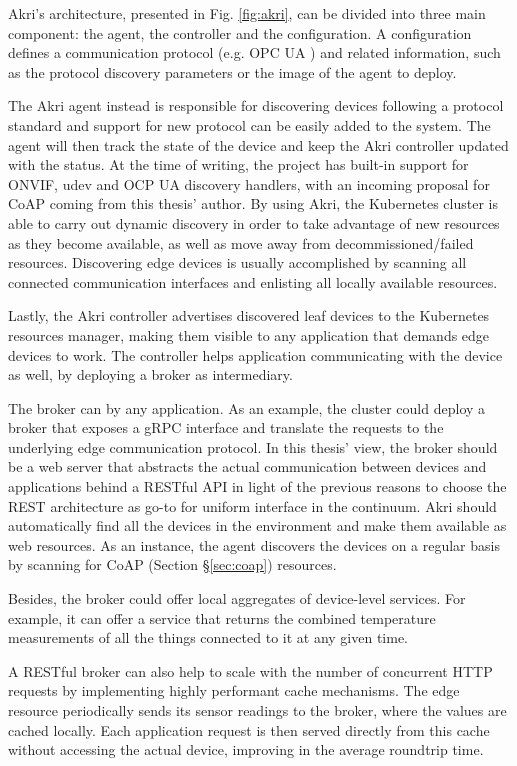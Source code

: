 Akri's architecture, presented in Fig. \ref{fig:akri}, can be divided into three main component: the agent, the controller and the configuration. A configuration defines a communication protocol (e.g. OPC UA \cite{rest-opc}) and related information, such as the protocol discovery parameters or the image of the agent to deploy.

The Akri agent instead is responsible for discovering devices following a protocol standard and support for new protocol can be easily added to the system. The agent will then track the state of the device and keep the Akri controller updated with the status. At the time of writing, the project has built-in support for ONVIF, udev and OCP UA \cite{rest-opc} discovery handlers, with an incoming proposal for CoAP \cite{coap} coming from this thesis' author. By using Akri, the Kubernetes cluster is able to carry out dynamic discovery in order to take advantage of new resources as they become available, as well as move away from decommissioned/failed resources. Discovering edge devices is usually accomplished by scanning all connected communication interfaces and enlisting all locally available resources.

Lastly, the Akri controller advertises discovered leaf devices to the Kubernetes resources manager, making them visible to any application that demands edge devices to work. The controller helps application communicating with the device as well, by deploying a broker as intermediary. 

The broker can by any application. As an example, the cluster could deploy a broker that exposes a gRPC \cite{gRPC} interface and translate the requests to the underlying edge communication protocol. In this thesis' view, the broker should be a web server that abstracts the actual communication between devices and applications behind a RESTful API in light of the previous reasons to choose the REST architecture as go-to for uniform interface in the continuum. Akri should automatically find all the devices in the environment and make them available as web resources. As an instance, the agent discovers the devices on a regular basis by scanning for CoAP (Section §\ref{sec:coap}) resources.

Besides, the broker could offer local aggregates of device-level services. For example, it can offer a service that returns the combined temperature measurements of all the things connected to it at any given time.

A RESTful broker can also help to scale with the number of concurrent HTTP requests by implementing highly performant cache mechanisms. The edge resource periodically sends its sensor readings to the broker, where the values are cached locally. Each application request is then served directly from this cache without accessing the actual device, improving in the average roundtrip time.

